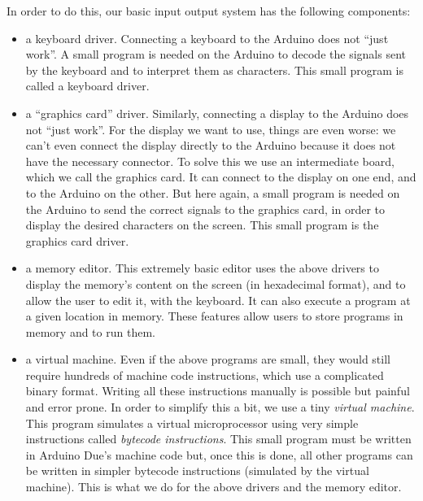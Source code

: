 In order to do this, our basic input output system has the following components:
\begin{itemize}
	\item a keyboard driver. Connecting a keyboard to the Arduino does not ``just
	work''. A small program is needed on the Arduino to decode the signals sent
	by the keyboard and to interpret them as characters. This small program is
	called a keyboard driver.

	\item a ``graphics card'' driver. Similarly, connecting a display to the
	Arduino does not ``just work''. For the display we want to use, things are
	even worse: we can't even connect the display directly to the Arduino because
	it does not have the necessary connector. To solve this we use an
	intermediate board, which we call the graphics card. It can connect to the
	display on one end, and to the Arduino on the other. But here again, a small
	program is needed on the Arduino to send the correct signals to the graphics
	card, in order to display the desired characters on the screen. This small
	program is the graphics card driver.

	\item a memory editor. This extremely basic editor uses the above drivers to
	display the memory's content on the screen (in hexadecimal format), and to
	allow the user to edit it, with the keyboard. It can also execute a program
	at a given location in memory. These features allow users to store programs
	in memory and to run them.

	\item a virtual machine. Even if the above programs are small, they would
	still require hundreds of machine code instructions, which use a complicated
	binary format. Writing all these instructions manually is possible but
	painful and error prone. In order to simplify this a bit, we use a tiny {\em
	virtual machine}. This program simulates a virtual microprocessor using very
	simple instructions called {\em bytecode instructions}. This small program
	must be written in Arduino Due's machine code but, once this is done, all
	other programs can be written in simpler bytecode instructions (simulated by
	the virtual machine). This is what we do for the above drivers and the memory
	editor.
\end{itemize}


